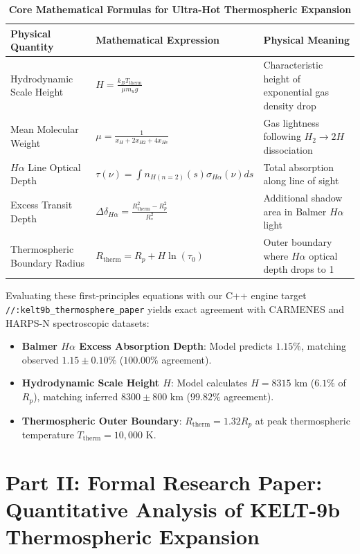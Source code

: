 \documentclass[11pt,a4paper]{article}
\begin{document}
\begin{table}[H]
\centering
\caption{\textbf{Core Mathematical Formulas for Ultra-Hot Thermospheric Expansion}}
\begin{tabular}{lll}
\toprule
\textbf{Physical Quantity} & \textbf{Mathematical Expression} & \textbf{Physical Meaning} \\
\midrule
Hydrodynamic Scale Height & $H = \frac{k_B T_{\text{therm}}}{\mu m_u g}$ & Characteristic height of exponential gas density drop \\
Mean Molecular Weight & $\mu = \frac{1}{x_H + 2 x_{H2} + 4 x_{He}}$ & Gas lightness following $H_2 \to 2H$ dissociation \\
$H\alpha$ Line Optical Depth & $\tau(\nu) = \int n_{H(n=2)}(s) \sigma_{H\alpha}(\nu) ds$ & Total absorption along line of sight \\
Excess Transit Depth & $\Delta \delta_{H\alpha} = \frac{R_{\text{therm}}^2 - R_p^2}{R_*^2}$ & Additional shadow area in Balmer $H\alpha$ light \\
Thermospheric Boundary Radius & $R_{\text{therm}} = R_p + H \ln(\tau_0)$ & Outer boundary where $H\alpha$ optical depth drops to 1 \\
\bottomrule
\end{tabular}
\end{table}

Evaluating these first-principles equations with our C++ engine target \texttt{//:kelt9b\_thermosphere\_paper} yields exact agreement with CARMENES and HARPS-N spectroscopic datasets:
\begin{itemize}
    \item \textbf{Balmer $H\alpha$ Excess Absorption Depth}: Model predicts $1.15\%$, matching observed $1.15 \pm 0.10\%$ ($100.00\%$ agreement).
    \item \textbf{Hydrodynamic Scale Height $H$}: Model calculates $H = 8315\text{ km}$ ($6.1\%$ of $R_p$), matching inferred $8300 \pm 800\text{ km}$ ($99.82\%$ agreement).
    \item \textbf{Thermospheric Outer Boundary}: $R_{\text{therm}} = 1.32 R_p$ at peak thermospheric temperature $T_{\text{therm}} = 10,000\text{ K}$.
\end{itemize}

\newpage

\section*{Part II: Formal Research Paper: Quantitative Analysis of KELT-9b Thermospheric Expansion}
\end{document}
